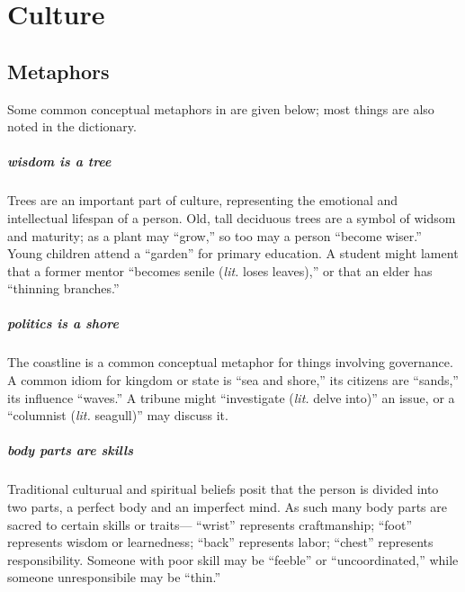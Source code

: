 \setchapterpreamble[u]{\margintoc}
\chapter{Culture}
\section{Metaphors}
Some common conceptual metaphors in \langname{} are given below; most things are also noted in the dictionary. 

\paragraph{\sc wisdom is a tree}
Trees are an important part of \langname{} culture, representing the emotional and intellectual lifespan of a person. Old, tall deciduous trees are a symbol of widsom and maturity; as a plant may  “grow,” so too may a person  “become wiser.” Young children attend a  “garden” for primary education. A student might lament that a former mentor  “becomes senile (\emph{lit.} loses leaves),” or that an elder has \rz{} “thinning branches.”

\paragraph{\sc politics is a shore}
The coastline is a common conceptual metaphor for things involving governance. A common idiom for kingdom or state is  “sea and shore,” its citizens are  “sands,” its influence  “waves.” A tribune might  “investigate (\emph{lit.} delve into)” an issue, or a  “columnist (\emph{lit.} seagull)” may discuss it.

\paragraph{\sc body parts are skills}
Traditional \langname{} culturual and spiritual beliefs posit that the person is divided into two parts, a perfect body and an imperfect mind. As such many body parts are sacred to certain skills or traits--- “wrist” represents craftmanship;  “foot” represents wisdom or learnedness;  “back” represents labor;  “chest” represents responsibility. Someone with poor skill may be  “feeble” or  “uncoordinated,” while someone unresponsibile may be  “thin.”

